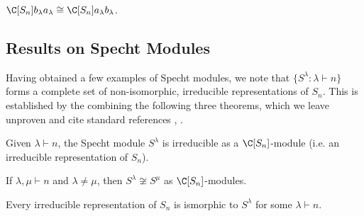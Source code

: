 \documentclass[../main.tex]{subfiles}
\begin{document}
\begin{proposition}
  $ \C[S_{n}]b_{\lambda}a_{\lambda}\cong \C[S_{n}]a_{\lambda}b_{\lambda} $.
\end{proposition}

\subsection{Results on Specht Modules}
Having obtained a few examples of Specht modules, we note that $ \{S^{\lambda}: \lambda\vdash n\} $ forms a complete set of non-isomorphic, irreducible representations of $ S_{n} $. This is established by the combining the following three theorems, which we leave unproven and cite standard references \cite{fultonharris}, \cite{stanley2}.
\begin{theorem}
  Given $ \lambda\vdash n $, the Specht module $ S^{\lambda} $ is irreducible as a $ \C[S_{n}] $-module (i.e. an irreducible representation of $ S_{n} $).
\end{theorem}

\begin{theorem}
  If $ \lambda,\mu\vdash n $ and $ \lambda\neq \mu $, then $ S^{\lambda}\not\cong S^{\mu} $ as $ \C[S_{n}] $-modules.
\end{theorem}

\begin{theorem}
  Every irreducible representation of $ S_{n} $ is ismorphic to $ S^{\lambda} $ for some $ \lambda\vdash n $.  
\end{theorem}
\end{document}
